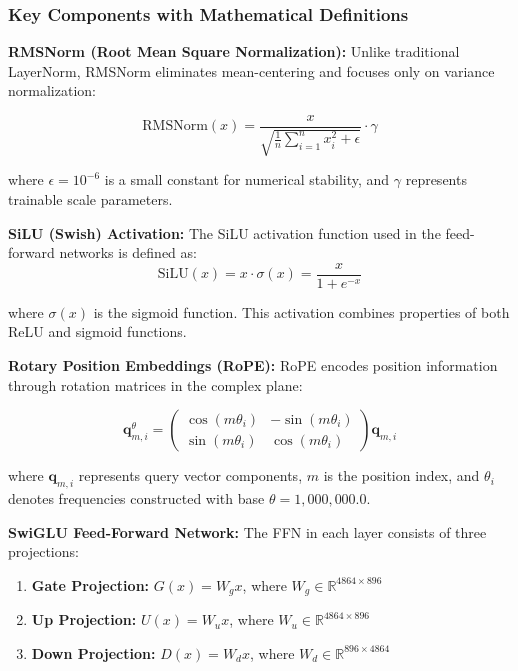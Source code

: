 \documentclass{article}
\begin{document}
\subsubsection*{Key Components with Mathematical Definitions}

\textbf{RMSNorm (Root Mean Square Normalization):} Unlike traditional LayerNorm, RMSNorm eliminates mean-centering and focuses only on variance normalization:

\begin{equation}
\text{RMSNorm}(x) = \frac{x}{\sqrt{\frac{1}{n}\sum_{i=1}^{n}x_i^2 + \epsilon}} \cdot \gamma
\end{equation}

\noindent where $\epsilon = 10^{-6}$ is a small constant for numerical stability, and $\gamma$ represents trainable scale parameters.

\textbf{SiLU (Swish) Activation:} The SiLU activation function used in the feed-forward networks is defined as:
\begin{equation}
\text{SiLU}(x) = x \cdot \sigma(x) = \frac{x}{1 + e^{-x}}
\end{equation}

\noindent where $\sigma(x)$ is the sigmoid function. This activation combines properties of both ReLU and sigmoid functions.

\textbf{Rotary Position Embeddings (RoPE):} RoPE\cite{su2024roformer} encodes position information through rotation matrices in the complex plane:

\begin{equation}
\mathbf{q}_{m,i}^{\theta} = \begin{pmatrix} \cos(m\theta_i) & -\sin(m\theta_i) \\ \sin(m\theta_i) & \cos(m\theta_i) \end{pmatrix} \mathbf{q}_{m,i}
\end{equation}

\noindent where $\mathbf{q}_{m,i}$ represents query vector components, $m$ is the position index, and $\theta_i$ denotes frequencies constructed with base $\theta = 1,000,000.0$.

\textbf{SwiGLU Feed-Forward Network:} The FFN in each layer consists of three projections:

\begin{enumerate}
\item \textbf{Gate Projection:} $G(x) = W_g x$, where $W_g \in \mathbb{R}^{4864 \times 896}$
\item \textbf{Up Projection:} $U(x) = W_u x$, where $W_u \in \mathbb{R}^{4864 \times 896}$
\item \textbf{Down Projection:} $D(x) = W_d x$, where $W_d \in \mathbb{R}^{896 \times 4864}$
\end{enumerate}
\end{document}
